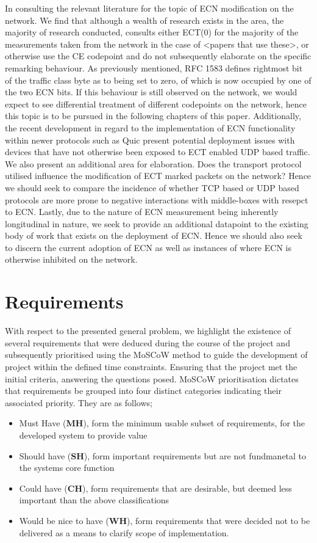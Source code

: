 \documentclass{l4proj}
\begin{document}
In consulting the relevant literature for the topic of ECN modification on the network. We find that although a wealth of research exists in the area, the majority of research conducted, consults either ECT(0) for the majority of the measurements taken from the network in the case of <papers that use these>, or otherwise use the CE codepoint and do not subsequently elaborate on the specific remarking behaviour. As previously mentioned, RFC 1583 defines rightmost bit of the traffic class byte as to being set to zero, of which is now occupied by one of the two ECN bits. If this behaviour is still observed on the network, we would expect to see differential treatment of different codepoints on the network, hence this topic is to be pursued in the following chapters of this paper. Additionally, the recent development in regard to the implementation of ECN functionality within newer protocols such as Quic present potential deployment issues with devices that have not otherwise been exposed to ECT enabled UDP based traffic. We also present an additional area for elaboration. Does the transport protocol utilised influence the modification of ECT marked packets on the network? Hence we should seek to compare the incidence of whether TCP based or UDP based protocols are more prone to negative interactions with middle-boxes with resepct to ECN. Lastly, due to the nature of ECN measurement being inherently longitudinal in nature, we seek to provide an additional datapoint to the existing body of work that exists on the deployment of ECN. Hence we should also seek to discern the current adoption of ECN as well as instances of where ECN is otherwise inhibited on the network.


\section{Requirements}

With respect to the presented general problem, we highlight the existence of several requirements that were deduced during the course of the project and subsequently prioritised using the MoSCoW method to guide the development of project within the defined time constraints. Ensuring that the project met the initial criteria, answering the questions posed. MoSCoW prioritisation dictates that requirements be grouped into four distinct categories indicating their associated priority. They are as follows;

\begin{itemize}
    \item Must Have (\textbf{MH}), form the minimum usable subset of requirements, for the developed system to provide value
    \item Should have (\textbf{SH}), form important requirements but are not fundmanetal to the systems core function
    \item Could have (\textbf{CH}), form requirements that are desirable, but deemed less important than the above classifications
    \item Would be nice to have (\textbf{WH}), form requirements that were decided not to be delivered as a means to clarify scope of implementation.
\end{itemize}
\end{document}
